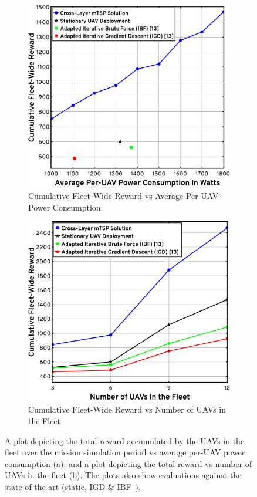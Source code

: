 \documentclass[10pt, twocolumn]{IEEEtran}
\begin{document}
\begin{figure}[t]
    \centering
    \begin{subfigure}{0.4925\linewidth}
        \centering
        \includegraphics[width=0.81\linewidth]{figs/reward_vs_average_power.pdf}
        \vspace{-1mm}
        \caption{Cumulative Fleet-Wide Reward vs Average Per-UAV Power Consumption}
        \label{F2a}
    \end{subfigure}
    \begin{subfigure}{0.4975\linewidth}
        \centering
        \includegraphics[width=0.81\linewidth]{figs/reward_vs_number_of_uavs.pdf}
        \vspace{-1mm}
        \caption{Cumulative Fleet-Wide Reward vs Number of UAVs in the Fleet}
        \label{F2b}
    \end{subfigure}
    \vspace{-6mm}
    \caption{A plot depicting the total reward accumulated by the UAVs in the fleet over the mission simulation period vs average per-UAV power consumption (a); and a plot depicting the total reward vs number of UAVs in the fleet (b). The plots also show evaluations against the state-of-the-art (static, IGD \& IBF~\cite{CORES_ICASSP}).}
    \vspace{-6mm}
    \label{F2}
\end{figure}
\end{document}
